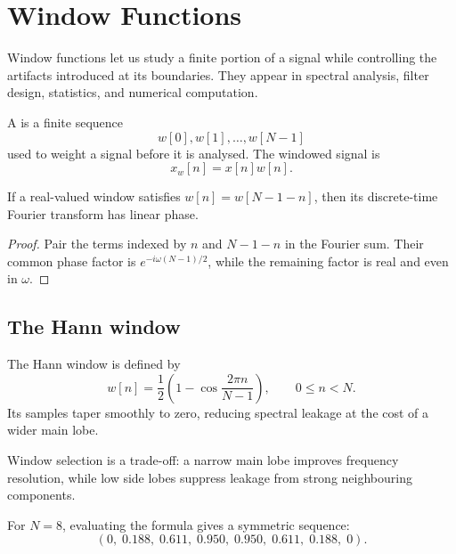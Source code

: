 \documentclass[11pt,a4paper,oneside]{report}
\begin{document}

\chapter{Window Functions}

Window functions let us study a finite portion of a signal while controlling
the artifacts introduced at its boundaries. They appear in spectral analysis,
filter design, statistics, and numerical computation.

\begin{definition}
A  is a finite sequence
\[
  w[0],w[1],\ldots,w[N-1]
\]
used to weight a signal before it is analysed. The windowed signal is
\[
  x_w[n] = x[n]w[n].
\]
\end{definition}

\begin{theorem}[Symmetry]
If a real-valued window satisfies \(w[n]=w[N-1-n]\), then its discrete-time
Fourier transform has linear phase.
\end{theorem}

\begin{proof}
Pair the terms indexed by \(n\) and \(N-1-n\) in the Fourier sum. Their common
phase factor is \(e^{-i\omega(N-1)/2}\), while the remaining factor is real and
even in \(\omega\).
\end{proof}

\section{The Hann window}

The Hann window is defined by
\[
  w[n] =
  \frac{1}{2}\left(1-\cos\frac{2\pi n}{N-1}\right),
  \qquad 0\le n<N.
\]
Its samples taper smoothly to zero, reducing spectral leakage at the cost of a
wider main lobe.

\begin{keyidea}
Window selection is a trade-off: a narrow main lobe improves frequency
resolution, while low side lobes suppress leakage from strong neighbouring
components.
\end{keyidea}

\begin{example}
For \(N=8\), evaluating the formula gives a symmetric sequence:
\[
  (0,\;0.188,\;0.611,\;0.950,\;0.950,\;0.611,\;0.188,\;0).
\]
\end{example}

\end{document}
